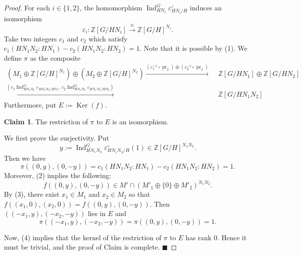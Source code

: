 \documentclass[12pt]{amsart}
\theoremstyle{plain}
\theoremstyle{definition}
\newtheorem*{claim}{Claim}
\renewcommand{\qed}{\hfill$\blacksquare$\par}
\numberwithin{thm}{section}
\numberwithin{equation}{section}
\newcommand{\Z}{\mathbb{Z}}
\DeclareMathOperator{\Ker}{Ker}
\DeclareMathOperator{\Ind}{Ind}
\DeclareMathOperator{\pr}{pr}
\begin{document}
\begin{proof}
For each $i\in \{1,2\}$, the homomorphism $\Ind_{HN_{i}}^{G}\varepsilon_{HN_{i}/H}^{\circ}$ induces an isomorphism
\begin{equation*}
\varepsilon_{i}\colon \Z[G/HN_{i}]\xrightarrow{\cong}\Z[G/H]^{N_{i}}. 
\end{equation*}
Take two integers $c_{1}$ and $c_{2}$ which satisfy $c_{1}(HN_{1}N_{2}:HN_{1})-c_{2}(HN_{1}N_{2}:HN_{2})=1$. Note that it is possible by (1). We define $\pi$ as the composite
\begin{align*}
(M_{1}\oplus \Z[G/H]^{N_{1}})\oplus (M_{2}\oplus \Z[G/H]^{N_{2}})\xrightarrow{(\varepsilon_{1}^{-1}\circ \pr_{2})\oplus (\varepsilon_{2}^{-1}\circ \pr_{2})}&\,\,\Z[G/HN_{1}]\oplus \Z[G/HN_{2}]\\
\xrightarrow{(c_{1}\Ind_{HN_{1}N_{2}}^{G}\varepsilon_{HN_{1}N_{2}/HN_{1}},\,c_{2}\Ind_{HN_{1}N_{2}}^{G}\varepsilon_{HN_{1}N_{2}/HN_{2}})}&\,\,\Z[G/HN_{1}N_{2}]
\end{align*}
Furthermore, put $E:=\Ker(f)$. 

\begin{claim}
The restriction of $\pi$ to $E$ is an isomorphism. 
\end{claim}

We first prove the surjectivity. Put
\begin{equation*}
y:=\Ind_{HN_{1}N_{2}}^{G}\varepsilon_{HN_{1}N_{2}/H}^{\circ}(1)\in \Z[G/H]^{N_{1}N_{2}}. 
\end{equation*}
Then we have
\begin{equation*}
\pi((0,y),(0,-y))=c_{1}(HN_{1}N_{2}:HN_{1})-c_{2}(HN_{1}N_{2}:HN_{2})=1. 
\end{equation*}
Moreover, (2) implies the following: 
\begin{equation*}
f((0,y),(0,-y))\in M'\cap (M'_{1}\oplus \{0\}\oplus M'_{2})^{N_{1}N_{2}}. 
\end{equation*}
By (3), there exist $x_{1}\in M_{1}$ and $x_{2}\in M_{2}$ so that $f((x_{1},0),(x_{2},0))=f((0,y),(0,-y))$. Then $((-x_{1},y),(-x_{2},-y))$ lies in $E$ and
\begin{equation*}
\pi((-x_{1},y),(-x_{2},-y))=\pi((0,y),(0,-y))=1. 
\end{equation*}

Now, (4) implies that the kernel of the restriction of $\pi$ to $E$ has rank $0$. Hence it must be trivial, and the proof of Claim is complete. \qed


\end{proof}
\end{document}
